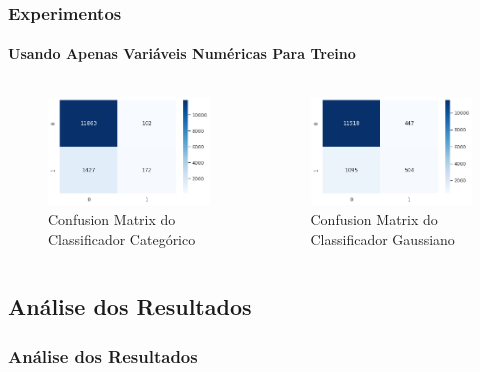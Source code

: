 \documentclass{beamer}
\begin{document}
\begin{frame}
    \frametitle{Experimentos}
    \framesubtitle{Usando Apenas Variáveis Numéricas Para Treino}
    \begin{columns}
        \begin{column}{0.5\textwidth}
            \begin{figure}[H]
                \centerline{\includegraphics[width=1.0\textwidth]{IMGS/cm-cnb-numeric.png}}
                
                \caption{\label{fig:cm3-cnb}Confusion Matrix do Classificador Categórico}
            \end{figure}
            
        \end{column}
        \begin{column}{0.5\textwidth}
            \begin{figure}[H]
                \centerline{\includegraphics[width=1.0\textwidth]{IMGS/cm-gnb-numeric.png}}
                \caption{\label{fig:cm3-gnb}Confusion Matrix do Classificador Gaussiano}
            \end{figure}
        \end{column}
        \end{columns}    
\end{frame}

\begin{frame}
\section{Análise dos Resultados}
\frametitle{Análise dos Resultados}   
\end{frame}
\end{document}
